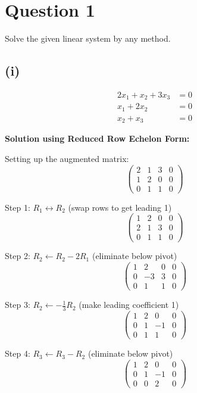 \documentclass[12pt]{article}
\begin{document}
\section*{Question 1}
Solve the given linear system by any method.

\subsection*{(i)}
\begin{align*}
2x_1 + x_2 + 3x_3 &= 0\\
x_1 + 2x_2 &= 0\\
x_2 + x_3 &= 0
\end{align*}

\textbf{Solution using Reduced Row Echelon Form:}

Setting up the augmented matrix:
\[
\left(\begin{array}{ccc|c}
2 & 1 & 3 & 0\\
1 & 2 & 0 & 0\\
0 & 1 & 1 & 0
\end{array}\right)
\]

Step 1: $R_1 \leftrightarrow R_2$ (swap rows to get leading 1)
\[
\left(\begin{array}{ccc|c}
1 & 2 & 0 & 0\\
2 & 1 & 3 & 0\\
0 & 1 & 1 & 0
\end{array}\right)
\]

Step 2: $R_2 \leftarrow R_2 - 2R_1$ (eliminate below pivot)
\[
\left(\begin{array}{ccc|c}
1 & 2 & 0 & 0\\
0 & -3 & 3 & 0\\
0 & 1 & 1 & 0
\end{array}\right)
\]

Step 3: $R_2 \leftarrow -\frac{1}{3}R_2$ (make leading coefficient 1)
\[
\left(\begin{array}{ccc|c}
1 & 2 & 0 & 0\\
0 & 1 & -1 & 0\\
0 & 1 & 1 & 0
\end{array}\right)
\]

Step 4: $R_3 \leftarrow R_3 - R_2$ (eliminate below pivot)
\[
\left(\begin{array}{ccc|c}
1 & 2 & 0 & 0\\
0 & 1 & -1 & 0\\
0 & 0 & 2 & 0
\end{array}\right)
\]
\end{document}
